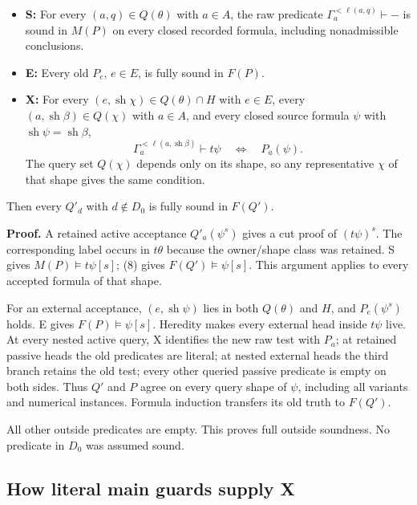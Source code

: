 \documentclass[
  11pt,
  letterpaper,
]{article}
\providecommand{\tightlist}{%
  \setlength{\itemsep}{0pt}\setlength{\parskip}{0pt}}
\begin{document}
\begin{itemize}
\tightlist
\item
  \textbf{S:} For every \((a,q)\in Q(\theta)\) with \(a\in A\), the raw
  predicate \(\Gamma_a^{<\ell(a,q)}\vdash-\) is sound in \(M(P)\) on
  every closed recorded formula, including nonadmissible conclusions.
\item
  \textbf{E:} Every old \(P_e\), \(e\in E\), is fully sound in \(F(P)\).
\item
  \textbf{X:} For every \((e,\operatorname{sh}\chi)\in Q(\theta)\cap H\)
  with \(e\in E\), every \((a,\operatorname{sh}\beta)\in Q(\chi)\) with
  \(a\in A\), and every closed source formula \(\psi\) with
  \(\operatorname{sh}\psi=\operatorname{sh}\beta\), \[
  \Gamma_a^{<\ell(a,\operatorname{sh}\beta)}\vdash t\psi
  \quad\Longleftrightarrow\quad P_a(\psi).
  \] The query set \(Q(\chi)\) depends only on its shape, so any
  representative \(\chi\) of that shape gives the same condition.
\end{itemize}

Then every \(Q'_d\) with \(d\notin D_0\) is fully sound in \(F(Q')\).

\textbf{Proof.} A retained active acceptance \(Q'_a(\psi^s)\) gives a
cut proof of \((t\psi)^s\). The corresponding label occurs in
\(t\theta\) because the owner/shape class was retained. S gives
\(M(P)\models t\psi[s]\); (8) gives \(F(Q')\models\psi[s]\). This
argument applies to every accepted formula of that shape.

For an external acceptance, \((e,\operatorname{sh}\psi)\) lies in both
\(Q(\theta)\) and \(H\), and \(P_e(\psi^s)\) holds. E gives
\(F(P)\models\psi[s]\). Heredity makes every external head inside
\(t\psi\) live. At every nested active query, X identifies the new raw
test with \(P_a\); at retained passive heads the old predicates are
literal; at nested external heads the third branch retains the old test;
every other queried passive predicate is empty on both sides. Thus
\(Q'\) and \(P\) agree on every query shape of \(\psi\), including all
variants and numerical instances. Formula induction transfers its old
truth to \(F(Q')\).

All other outside predicates are empty. This proves full outside
soundness. No predicate in \(D_0\) was assumed sound.

\subsection{How literal main guards supply
X}\label{how-literal-main-guards-supply-x}
\end{document}
